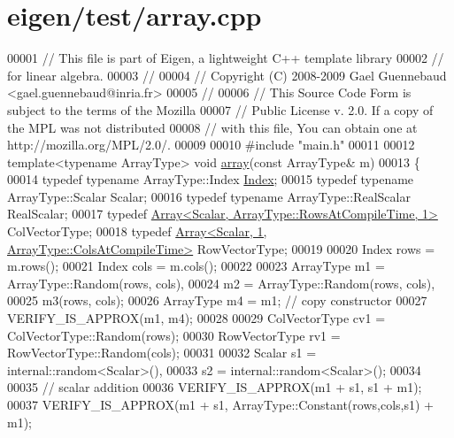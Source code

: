 \hypertarget{eigen_2test_2array_8cpp_source}{}\section{eigen/test/array.cpp}
\label{eigen_2test_2array_8cpp_source}

\begin{DoxyCode}
00001 \textcolor{comment}{// This file is part of Eigen, a lightweight C++ template library}
00002 \textcolor{comment}{// for linear algebra.}
00003 \textcolor{comment}{//}
00004 \textcolor{comment}{// Copyright (C) 2008-2009 Gael Guennebaud <gael.guennebaud@inria.fr>}
00005 \textcolor{comment}{//}
00006 \textcolor{comment}{// This Source Code Form is subject to the terms of the Mozilla}
00007 \textcolor{comment}{// Public License v. 2.0. If a copy of the MPL was not distributed}
00008 \textcolor{comment}{// with this file, You can obtain one at http://mozilla.org/MPL/2.0/.}
00009 
00010 \textcolor{preprocessor}{#include "main.h"}
00011 
00012 \textcolor{keyword}{template}<\textcolor{keyword}{typename} ArrayType> \textcolor{keywordtype}{void} \hyperlink{class_eigen_1_1array}{array}(\textcolor{keyword}{const} ArrayType& m)
00013 \{
00014   \textcolor{keyword}{typedef} \textcolor{keyword}{typename} ArrayType::Index \hyperlink{namespace_eigen_a62e77e0933482dafde8fe197d9a2cfde}{Index};
00015   \textcolor{keyword}{typedef} \textcolor{keyword}{typename} ArrayType::Scalar Scalar;
00016   \textcolor{keyword}{typedef} \textcolor{keyword}{typename} ArrayType::RealScalar RealScalar;
00017   \textcolor{keyword}{typedef} \hyperlink{group___core___module_class_eigen_1_1_array}{Array<Scalar, ArrayType::RowsAtCompileTime, 1>} 
      ColVectorType;
00018   \textcolor{keyword}{typedef} \hyperlink{group___core___module_class_eigen_1_1_array}{Array<Scalar, 1, ArrayType::ColsAtCompileTime>} 
      RowVectorType;
00019 
00020   Index rows = m.rows();
00021   Index cols = m.cols(); 
00022 
00023   ArrayType m1 = ArrayType::Random(rows, cols),
00024              m2 = ArrayType::Random(rows, cols),
00025              m3(rows, cols);
00026   ArrayType m4 = m1; \textcolor{comment}{// copy constructor}
00027   VERIFY\_IS\_APPROX(m1, m4);
00028 
00029   ColVectorType cv1 = ColVectorType::Random(rows);
00030   RowVectorType rv1 = RowVectorType::Random(cols);
00031 
00032   Scalar  s1 = internal::random<Scalar>(),
00033           s2 = internal::random<Scalar>();
00034 
00035   \textcolor{comment}{// scalar addition}
00036   VERIFY\_IS\_APPROX(m1 + s1, s1 + m1);
00037   VERIFY\_IS\_APPROX(m1 + s1, ArrayType::Constant(rows,cols,s1) + m1);

\end{DoxyCode}
